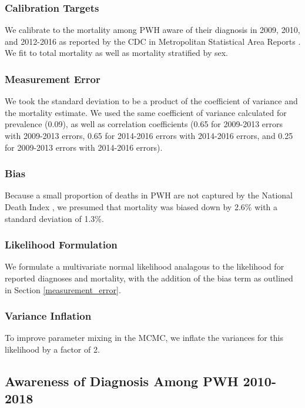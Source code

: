 \documentclass{article}
\begin{document}
\subsubsection{Calibration Targets}
We calibrate to the mortality among PWH aware of their diagnosis in 2009, 2010, and 2012-2016 as reported by the CDC in Metropolitan Statistical Area Reports \cite{msa2010,msa2011,msa2013,msa2014,msa2015,msa2016,cdc24.2}. We fit to total mortality as well as mortality stratified by sex.

\subsubsection{Measurement Error}

We took the standard deviation to be a product of the coefficient of variance and the mortality estimate. We used the same coefficient of variance calculated for prevalence (0.09), as well as correlation coefficients (0.65 for 2009-2013 errors with 2009-2013 errors, 0.65 for 2014-2016 errors with 2014-2016 errors, and 0.25 for 2009-2013 errors with 2014-2016 errors).

\subsubsection{Bias}

Because a small proportion of deaths in PWH are not captured by the National Death Index \cite{hanna2009,trepka2011}, we presumed that mortality was biased down by 2.6\% with a standard deviation of 1.3\%.\cite{hanna2009,trepka2011}

\subsubsection{Likelihood Formulation}

We formulate a multivariate normal likelihood analagous to the likelihood for reported diagnoses and mortality, with the addition of the bias term as outlined in Section \ref{measurement_error}.

\subsubsection{Variance Inflation}
To improve parameter mixing in the MCMC, we inflate the variances for this likelihood by a factor of 2.



\subsection{Awareness of Diagnosis Among PWH 2010-2018}\label{likelihood_awareness}
\end{document}
